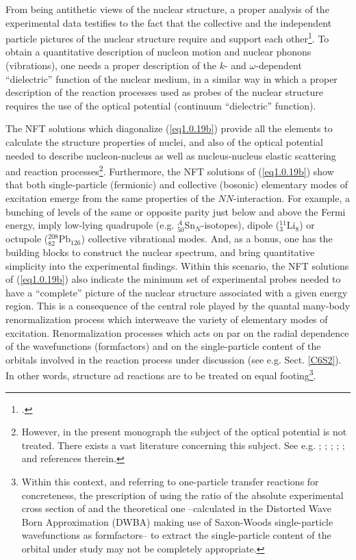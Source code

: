 From being antithetic views of the nuclear structure, a proper analysis of the experimental data testifies to the fact that the collective and the independent particle pictures of the nuclear structure require and support each other\footnote{\cite{Bohr:75}.}. To obtain a quantitative description of nucleon  motion and nuclear phonons (vibrations), one needs a proper description of the $k$- and $\omega$-dependent ``dielectric'' function of the nuclear medium, in a similar way in which a proper description of the reaction processes used as probes of the nuclear structure requires the use of the optical potential (continuum ``dielectric'' function). 


The NFT solutions which diagonalize  (\ref{eq1.0.19b}) provide all the elements to calculate the structure properties of nuclei, and also of the optical potential needed to describe nucleon-nucleus as well as nucleus-nucleus elastic scattering and reaction processes\footnote{\label{f21c1}However, in the present monograph the subject of the optical potential is not treated.  There exists a vast literature concerning this subject. See e.g. \cite{Feshbach:58,Feshbach:62,Jackson:70,Jeukenne:76,Sartor:80,Pollarolo:83,Satchler:83,Broglia:04a,Dickhoff:05,Montanari:14,Dickhoff:17}; \cite{Dickhoff:19};  \cite{Fernandez:10}; \cite{Fernandez:10b}; \cite{Jenning:11};  \cite{Barbieri:05,Rotureau:17,Broglia:81b} and references therein.}.
Furthermore, the NFT solutions of (\ref{eq1.0.19b}) show that both single-particle (fermionic) and collective (bosonic) elementary modes of excitation emerge from the same properties of the $NN$-interaction. For example, a bunching of levels of the same or opposite parity just below and above the Fermi energy, imply low-lying quadrupole (e.g. $^A_{50}$Sn$_{N}$-isotopes), dipole ($^{11}_3$Li$_8$) or octupole ($^{208}_{82}$Pb$_{126}$) collective vibrational modes. And, as a bonus, one has the building blocks to construct the nuclear spectrum, and bring quantitative simplicity into the experimental findings. Within this scenario, the NFT solutions of (\ref{eq1.0.19b}) also indicate the minimum set of experimental probes needed to have a ``complete'' picture of the nuclear structure associated with a given energy region. This is a consequence of the central role played by the quantal many-body renormalization process which interweave the variety of elementary modes of excitation.
Renormalization processes which acts on par on the radial dependence of the wavefunctions (formfactors) and on the single-particle content of the orbitals involved in the reaction process under discussion (see e.g. Sect. \ref{C6S2}). In other words, structure ad reactions are to be treated on equal footing\footnote{Within this context, and referring to one-particle transfer reactions for concreteness, the prescription of using the ratio of the absolute experimental cross section of and the theoretical one --calculated in the Distorted Wave Born Approximation (DWBA) making use of Saxon-Woods single-particle wavefunctions as formfactors-- to extract the single-particle content of the orbital under study may not be completely appropriate.}. 


